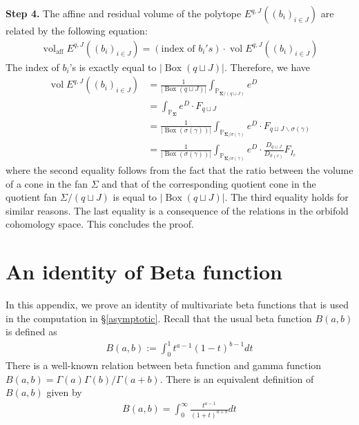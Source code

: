 \documentclass[11pt,reqno]{amsart}
\def\PP {{\mathbb P}}
\theoremstyle{definition}
\numberwithin{equation}{section}
\begin{document}
\medskip

{\bf Step 4.}
The affine and residual volume of the polytope $E^{q,J}((b_i)_{i\in J})$ are related by the following equation:
\begin{align*}
	\operatorname{vol}_{\mathrm{aff}}E^{q,J}((b_i)_{i\in J}) = (\text{index of }b_i's)\cdot \operatorname{vol}E^{q,J}((b_i)_{i\in J})
\end{align*}
The index of $b_i$'s is exactly equal to $|\operatorname{Box}(q\sqcup J)|$. Therefore, we have
\begin{align*}
	\operatorname{vol}E^{q,J}((b_i)_{i\in J})&=\frac{1}{|\operatorname{Box}(q\sqcup J)|}\int_{\PP_{\mathbf{\Sigma}/(q\sqcup J)}}e^{D}\\
	&=\int_{\PP_{\mathbf{\Sigma}}}e^{D}\cdot F_{q\sqcup J}\\
	&=\frac{1}{|\operatorname{Box}(\sigma(\gamma))|}\int_{\PP_{\mathbf{\Sigma}/\sigma(\gamma)}}e^{D}\cdot F_{q\sqcup J\backslash\sigma(\gamma)}\\
	&=\frac{1}{|\operatorname{Box}(\sigma(\gamma))|}\int_{\PP_{\mathbf{\Sigma}/\sigma(\gamma)}}e^{D}\cdot \frac{D_{q\sqcup J}}{D_{\sigma(c)}}F_{I_c}
\end{align*}
where the second equality follows from the fact that the ratio between the volume of a cone in the fan $\Sigma$ and that of the corresponding quotient cone in the quotient fan $\Sigma/(q\sqcup J)$ is equal to $|\operatorname{Box}(q\sqcup J)|$. The third equality holds for similar reasons. The last equality is a consequence of the relations in the orbifold cohomology space. This concludes the proof.



\section{An identity of Beta function}\label{beta function}
In this appendix, we prove an identity of multivariate beta functions that is used in the computation in \S\ref{asymptotic}. Recall that the usual beta function $B(a,b)$ is defined as
\begin{align*}
	B(a,b):=\int_{0}^1 t^{a-1}(1-t)^{b-1}dt
\end{align*}
There is a well-known relation between beta function and gamma function $B(a,b)=\Gamma(a)\Gamma(b)/\Gamma(a+b)$. There is an equivalent definition of $B(a,b)$ given by
\begin{align*}
	B(a,b)=\int_{0}^{\infty}\frac{t^{a-1}}{(1+t)^{a+b}}dt
\end{align*}
\end{document}
